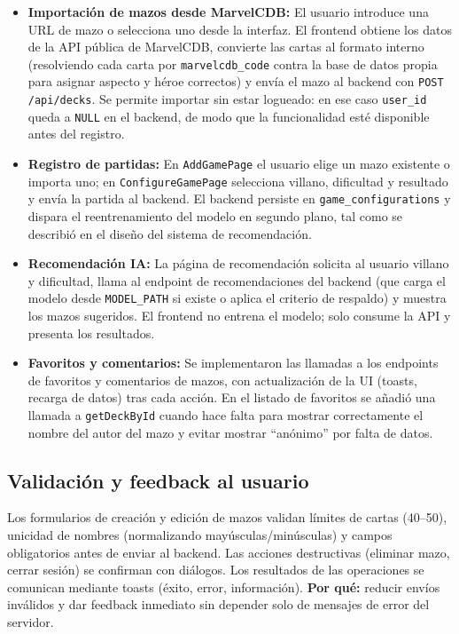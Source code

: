 \begin{itemize}
    \item \textbf{Importación de mazos desde MarvelCDB:} El usuario introduce una URL de mazo o selecciona uno desde la interfaz. El frontend obtiene los datos de la API pública de MarvelCDB, convierte las cartas al formato interno (resolviendo cada carta por \texttt{marvelcdb\_code} contra la base de datos propia para asignar aspecto y héroe correctos) y envía el mazo al backend con \texttt{POST /api/decks}. Se permite importar sin estar logueado: en ese caso \texttt{user\_id} queda a \texttt{NULL} en el backend, de modo que la funcionalidad esté disponible antes del registro.
    \item \textbf{Registro de partidas:} En \texttt{AddGamePage} el usuario elige un mazo existente o importa uno; en \texttt{ConfigureGamePage} selecciona villano, dificultad y resultado y envía la partida al backend. El backend persiste en \texttt{game\_configurations} y dispara el reentrenamiento del modelo en segundo plano, tal como se describió en el diseño del sistema de recomendación.
    \item \textbf{Recomendación IA:} La página de recomendación solicita al usuario villano y dificultad, llama al endpoint de recomendaciones del backend (que carga el modelo desde \texttt{MODEL\_PATH} si existe o aplica el criterio de respaldo) y muestra los mazos sugeridos. El frontend no entrena el modelo; solo consume la API y presenta los resultados.
    \item \textbf{Favoritos y comentarios:} Se implementaron las llamadas a los endpoints de favoritos y comentarios de mazos, con actualización de la UI (toasts, recarga de datos) tras cada acción. En el listado de favoritos se añadió una llamada a \texttt{getDeckById} cuando hace falta para mostrar correctamente el nombre del autor del mazo y evitar mostrar ``anónimo'' por falta de datos.
\end{itemize}

\subsection{Validación y feedback al usuario}

Los formularios de creación y edición de mazos validan límites de cartas (40--50), unicidad de nombres (normalizando mayúsculas/minúsculas) y campos obligatorios antes de enviar al backend. Las acciones destructivas (eliminar mazo, cerrar sesión) se confirman con diálogos. Los resultados de las operaciones se comunican mediante toasts (éxito, error, información). \textbf{Por qué:} reducir envíos inválidos y dar feedback inmediato sin depender solo de mensajes de error del servidor.

